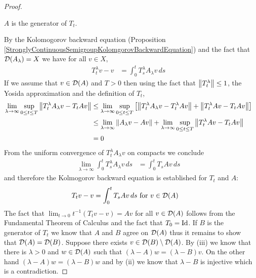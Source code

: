 \begin{proof}
\begin{clm} $A$ is the generator of $T_t$.
\end{clm}
By the Kolomogorov backward equation (Proposition \ref{StronglyContinuousSemigroupKolomgorovBackwardEquation}) and the fact that $\mathcal{D}(A_\lambda) = X$ we have for all $v \in X$,
\begin{align*}
T^\lambda_t v - v &= \int_0^t T^\lambda_s A_\lambda v \, ds
\end{align*}
If we assume that $v \in \mathcal{D}(A)$ and $T > 0$ then using the fact that $\left \lVert T^\lambda_t \right \rVert \leq 1$, the Yosida approximation and the definition of $T_t$,
\begin{align*}
\lim_{\lambda \to \infty} \sup_{0 \leq t \leq T} \left \lVert T^\lambda_t A_\lambda v - T_t A v \right \rVert 
&\leq \lim_{\lambda \to \infty} \sup_{0 \leq t \leq T} \left[ \left \lVert T^\lambda_t A_\lambda v - T^\lambda_t A v \right \rVert + \left \lVert T^\lambda_t A v - T_t A v \right \rVert \right]\\
&\leq \lim_{\lambda \to \infty} \left \lVert A_\lambda v - A v \right \rVert + \lim_{\lambda \to \infty} \sup_{0 \leq t \leq T} \left \lVert T^\lambda_t A v - T_t A v \right \rVert  \\
&=0
\end{align*}
From the uniform convergence of $T^\lambda_t A_\lambda v $ on compacts we conclude 
\begin{align*}
\lim_{\lambda \to \infty} \int_0^t T^\lambda_s A_\lambda v \, ds &= \int_0^t T_s A v \, ds
\end{align*}
and therefore the Kolmogorov backward equation is established for $T_t$ and $A$:
\begin{align*}
T_t v - v &= \int_0^t T_s A v \, ds \text{ for $v \in \mathcal{D}(A)$}
\end{align*}
The fact that $\lim_{t \to 0} t^{-1} (T_t v -v) =Av$ for all $v \in \mathcal{D}(A)$ follows from the Fundamental Theorem of Calculus and the fact that $T_0 = \operatorname*{Id}$.  If $B$ is the 
generator of $T_t$ we know that $A$ and $B$ agree on $\mathcal{D}(A)$ thus it remains to show that $\mathcal{D}(A)=\mathcal{D}(B)$.  Suppose there exists $v \in \mathcal{D}(B) \setminus \mathcal{D}(A)$.  By (iii) we know that there is $\lambda > 0$ and $w \in \mathcal{D}(A)$ such that $(\lambda - A) w = (\lambda - B) v$.  On the other hand $(\lambda - A) w =(\lambda - B) w$ and by (ii) we know that $\lambda - B$ is injective which is a contradiction.
\end{proof}

